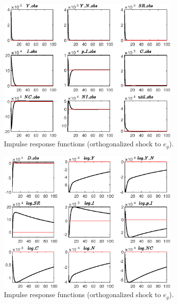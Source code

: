  
\begin{figure}[H]
\centering 
\includegraphics[width=0.80\textwidth]{BRS_growth/graphs/BRS_growth_IRF_e_g1}
\caption{Impulse response functions (orthogonalized shock to ${e_g}$).}\label{Fig:IRF:e_g:1}
\end{figure}
 
\begin{figure}[H]
\centering 
\includegraphics[width=0.80\textwidth]{BRS_growth/graphs/BRS_growth_IRF_e_g2}
\caption{Impulse response functions (orthogonalized shock to ${e_g}$).}\label{Fig:IRF:e_g:2}
\end{figure}
 
